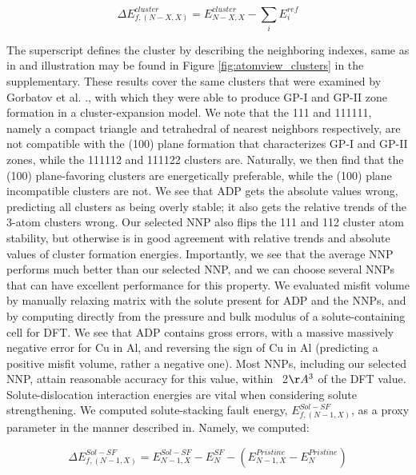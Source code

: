 \documentclass{article}
\begin{document}
\begin{equation}
\Delta E^{cluster}_{f,(N-X,X)} = E^{cluster}_{N-X,X} - \sum_i E^{ref}_i
\end{equation}

The superscript defines the cluster by describing the neighboring indexes, same as in \cite{Gorbatov2019EffectiveAlloys} and illustration may be found in Figure \ref{fig:atomview_clusters} 
in the supplementary.
These results cover the same clusters that were examined by Gorbatov et al. .\cite{Gorbatov2019EffectiveAlloys}, with which they were able to produce GP-I and GP-II zone formation in a cluster-expansion model.
We note that the 111 and 111111, namely a compact triangle and tetrahedral of nearest neighbors respectively, are not compatible with the (100) plane formation that characterizes GP-I and GP-II zones, while the 111112 and 111122 clusters are.
Naturally, we then find that the (100) plane-favoring clusters are energetically preferable, while the (100) plane incompatible clusters are not.
We see that ADP gets the absolute values wrong, predicting all clusters as being overly stable; it also gets the relative trends of the 3-atom clusters wrong.
Our selected NNP also flips the 111 and 112 cluster atom stability, but otherwise is in good agreement with relative trends and absolute values of cluster formation energies.
Importantly, we see that the average NNP performs much better than our selected NNP, and we can choose several NNPs that can have excellent performance for this property. 
We evaluated misfit volume by manually relaxing matrix with the solute present for ADP and the NNPs, and by computing directly from the pressure and bulk modulus of a solute-containing cell for DFT.
We see that ADP contains gross errors, with a massive massively negative error for Cu in Al, and reversing the sign of Cu in Al (predicting a positive misfit volume, rather a negative one).
Most NNPs, including our selected NNP, attain reasonable accuracy for this value, within ~2$\AA^3$ of the DFT value. 
Solute-dislocation interaction energies are vital when considering solute strengthening\cite{Leyson2010}.
We computed solute-stacking fault energy, $E^{Sol-SF}_{f,(N-1,X)}$, as a proxy parameter in the manner described in\cite{Yin2017a}.
Namely, we computed:

\begin{equation}
\Delta E^{Sol-SF}_{f,(N-1,X)} = E^{Sol-SF}_{N-1,X} - E^{SF}_{N} - (E^{Pristine}_{N-1,X}-E^{Pristine}_{N})
\end{equation}
\end{document}
